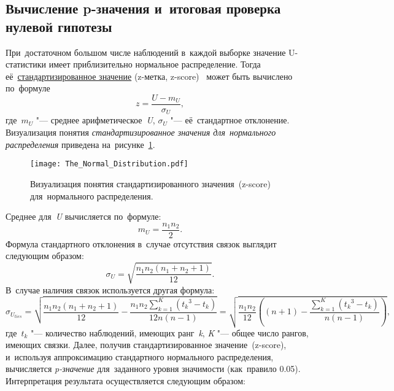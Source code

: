 \documentclass[]{scrreprt}
\begin{document}
\subsection{Вычисление p-значения и~итоговая проверка нулевой гипотезы}
При~достаточном большом числе наблюдений в~каждой выборке значение U-статистики имеет приблизительно нормальное распределение. Тогда её~\href{https://en.wikipedia.org/wiki/Standard_score}{стандартизированное значение} (z-метка, \foreignlanguage{english}{z-score})~\cite{Wiki:z-score} может быть вычислено по~формуле
\begin{equation}\label{eq:z-score}
z = \frac{U-m_{U}}{\sigma_{U}},
\end{equation}
где~${\textstyle m_{U}}$ "--- среднее арифметическое~\textit{U}, ${\textstyle \sigma_{U}}$ "--- её~стандартное отклонение. Визуализация понятия \emph{стандартизированное значения для~нормального распределения} приведена на~рисунке~\ref{fig:z-score}.
\begin{figure}[ht]
	\centering
	\texttt{[image: The\_Normal\_Distribution.pdf]}
	\caption{Визуализация понятия стандартизированного значения~(z-score) для~нормального распределения. \cite{Wiki:z-score}}\label{fig:z-score}
\end{figure}
Среднее для~\textit{U} вычисляется по~формуле:
\begin{equation}\label{eq:U-mean}
m_{U} = \frac{n_{1}n_{2}}{2}.
\end{equation}
Формула стандартного отклонения в~случае отсутствия связок выглядит следующим образом:
\begin{equation}\label{eq:standard-deviation-no-ties}
\sigma_{U} =  \sqrt{\frac{n_{1}n_{2}(n_{1}+n_{2}+1)}{12}}.
\end{equation}
В~случае наличия связок используется другая формула:
\begin{equation}\label{eq:standard-deviation-ties}
\sigma_{U_{ties}} = \sqrt{\frac{n_{1}n_{2}(n_{1}+n_{2}+1)}{12} - \frac{n_{1}n_{2}\sum_{k=1}^{K}({t_{k}}^{3} - t_{k})}{12n(n-1)}} = \sqrt{\frac{n_{1}n_{2}}{12} \left((n+1)-\frac{\sum_{k=1}^{K}({t_{k}}^{3} - t_{k})}{n(n-1)}\right)},
\end{equation}
где~${\textstyle t_{k}}$ "--- количество наблюдений, имеющих ранг~\textit{k}, \textit{K} "--- общее число рангов, имеющих связки.
Далее, получив стандартизированное значение~(z-score), и~используя аппроксимацию стандартного нормального распределения, вычисляется \textit{p-значение} для~заданного уровня значимости (как~правило 0.05). Интерпретация результата осуществляется следующим образом:
\end{document}
